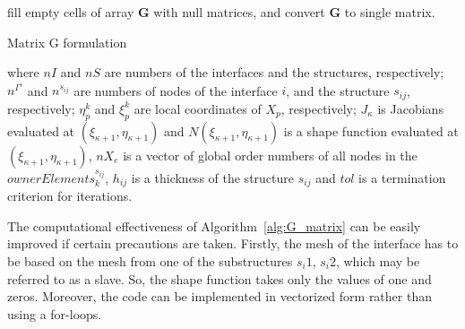 \documentclass[a4paper,12pt]{article}
\begin{document}
{\begin{algorithm}[H]
{{		}
	}
	fill empty cells of array \(\mathbf{G}\) with null matrices, and convert 
	\(\mathbf{G}\) to single matrix.
	\caption{Matrix G formulation}
	\label{alg:G_matrix}
\end{algorithm}
where \(nI\) and \(nS\) are numbers of the interfaces and the structures, 
respectively; \(n^{\Gamma^i}\) and \(n^{s_{ij}}\) are numbers of nodes of the 
interface \(i\), and the structure \(s_{ij}\), respectively; \(\eta^k_p\) and  
\(\xi^k_p\) are local coordinates of \(X_p\), respectively; \(J_{\kappa}\) is 
Jacobians evaluated at \((\xi_{\kappa+1},\eta_{\kappa+1})\) and 
\(N(\xi_{\kappa+1},\eta_{\kappa+1})\) is a shape function evaluated at 
\((\xi_{\kappa+1},\eta_{\kappa+1})\), \(nX_e\) is a vector of global order 
numbers of all nodes in the \(ownerElements^{s_{ij}}_k\), \(h_{ij}\) is a 
thickness of the structure \(s_{ij}\) and \(tol\) is a termination criterion 
for iterations.

The computational effectiveness of Algorithm~\ref{alg:G_matrix} can be 
easily improved if certain precautions are taken.
Firstly, the mesh of the interface has to be based on the mesh from one of the 
substructures \(s_i1\), \(s_i2\), which may be referred to as a slave.
So, the shape function takes only the values of one and zeros.
Moreover, the code can be implemented in vectorized form rather than using a 
for-loops.

}
\end{document}
